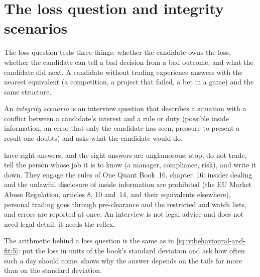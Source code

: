 \section{The loss question and integrity scenarios}

The loss question tests three things: whether the candidate owns the loss, whether the candidate can tell a bad decision from a
bad outcome, and what the candidate did next. A candidate without trading experience answers with the nearest equivalent (a
competition, a project that failed, a bet in a game) and the same structure.

\begin{definition}\label{def:iv:behavioural-and-fit:integrity}
An \emph{integrity scenario} is an interview question that describes a situation with a conflict between
a candidate's interest and a rule or duty (possible inside information, an error that only the candidate has seen, pressure to
present a result one doubts) and asks what the candidate would do.
\end{definition}

 have right answers, and the right answers are unglamorous: stop, do not trade, tell the person whose job it is
to know (a manager, compliance, risk), and write it down. They engage the rules of One Quant Book~16, chapter~16: insider dealing
and the unlawful disclosure of inside information are prohibited (the EU Market Abuse Regulation, articles 8, 10 and~14, and their
equivalents elsewhere), personal trading goes through pre-clearance and the restricted and watch lists, and errors are reported at
once. An interview is not legal advice and does not need legal detail; it needs the reflex.

The arithmetic behind a loss question is the same as in \cref{iq:iv:behavioural-and-fit:5}: put the loss in units of the book's
standard deviation and ask how often such a day should come.  shows why the answer
depends on the tails far more than on the standard deviation.

